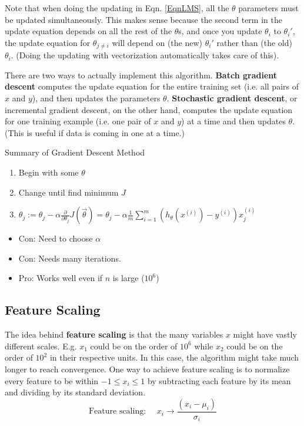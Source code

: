 \documentclass[letterpaper,10pt]{article}
\begin{document}
Note that when doing the updating in Eqn. \ref{EqnLMS}, all the $\theta$ parameters must be updated simultaneously. This makes sense because the second term in the update equation depends on all the rest of the $\theta$s, and once you update $\theta_i$ to $\theta_i'$, the update equation for $\theta_{j\neq i}$ will depend on (the new) $\theta_i'$ rather than (the old) $\theta_i$. (Doing the updating with vectorization automatically takes care of this). 

There are two ways to actually implement this algorithm. \textbf{Batch gradient descent} computes the update equation for the entire training set (i.e. all pairs of $x$ and $y$), and then updates the parameters $\theta$. \textbf{Stochastic gradient descent}, or incremental gradient descent, on the other hand, computes the update equation for one training example (i.e. one pair of $x$ and $y$) at a time and then updates $\theta$. (This is useful if data is coming in one at a time.)

Summary of Gradient Descent Method
	\begin{enumerate}
	\item Begin with some $\theta$
	\item Change until find minimum $J$
	\item $\theta_j := \theta_j - \alpha \frac{\partial}{\partial \theta_j} J(\vec \theta) = \theta_j - \alpha \frac{1}{m} \sum_{i=1}^m \left( h_{\theta}(x^{(i)}) - y^{(i)}  \right) x_j^{(i)}$
	\end{enumerate}
	\begin{itemize}
	\item Con: Need to choose $\alpha$
	\item Con: Needs many iterations.
	\item Pro: Works well even if $n$ is large ($10^6$)
	\end{itemize}
	
\subsection{Feature Scaling} The idea behind \textbf{feature scaling} is that the many variables $x$ might have vastly different scales. E.g. $x_1$ could be on the order of $10^6$ while $x_2$ could be on the order of $10^2$ in their respective units. In this case, the algorithm might take much longer to reach convergence. One way to achieve feature scaling is to normalize every feature to be within $-1\leq x_i \leq 1$ by subtracting each feature by its mean and dividing by its standard deviation.
\begin{equation}
\text{Feature scaling: }\quad x_i \rightarrow \frac{(x_i-\mu_i)}{\sigma_i}\label{EqnNormalization}
\end{equation}
\end{document}

